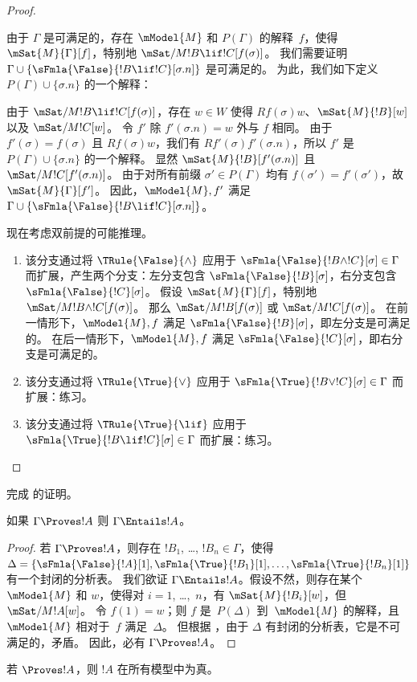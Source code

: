 \documentclass[../../../include/open-logic-section]{subfiles}
\begin{document}
\begin{proof}
\begin{enumerate}
  由于 $\Gamma$ 是可满足的，存在 $\mModel{M}$ 和 $P(\Gamma)$ 的解释~$f$，使得 $\mSat{M}{\Gamma}[f]$，特别地 $\mSat/{M}{!B \lif !C}[f(\sigma)]$。
  我们需要证明 $\Gamma \cup \{\sFmla{\False}{!B \lif !C}[\sigma.n]\}$ 是可满足的。
  为此，我们如下定义 $P(\Gamma)
  \cup \{\sigma.n\}$ 的一个解释：

  由于 $\mSat/{M}{!B \lif !C}[f(\sigma)]$，存在 $w \in W$ 使得 $Rf(\sigma)w$、$\mSat{M}{!B}[w]$ 以及 $\mSat/{M}{!C}[w]$。
  令 $f'$ 除 $f'(\sigma.n) = w$ 外与 $f$ 相同。
  由于 $f'(\sigma) = f(\sigma)$ 且 $Rf(\sigma)w$，我们有 $Rf'(\sigma)f'(\sigma.n)$，所以 $f'$ 是 $P(\Gamma) \cup \{\sigma.n\}$ 的一个解释。
  显然 $\mSat{M}{!B}[f'(\sigma.n)]$ 且 $\mSat/{M}{!C}[f'(\sigma.n)]$。
  由于对所有前缀 $\sigma' \in P(\Gamma)$ 均有 $f(\sigma') = f'(\sigma')$，故 $\mSat{M}{\Gamma}[f']$。
  因此，$\mModel{M}, f'$ 满足 $\Gamma \cup \{\sFmla{\False}{!B \lif !C}[\sigma.n]\}$。
\end{enumerate}
现在考虑双前提的可能推理。
\begin{enumerate}
\item 该分支通过将 $\TRule{\False}{\land}$ 应用于 $\sFmla{\False}{!B \land !C}[\sigma] \in \Gamma$ 而扩展，产生两个分支：左分支包含 $\sFmla{\False}{!B}[\sigma]$，右分支包含 $\sFmla{\False}{!C}[\sigma]$。
  假设 $\mSat{M}{\Gamma}[f]$，特别地 $\mSat/{M}{!B \land !C}[f(\sigma)]$。
  那么 $\mSat/{M}{!B}[f(\sigma)]$ 或 $\mSat/{M}{!C}[f(\sigma)]$。
  在前一情形下，$\mModel{M}, f$ 满足 $\sFmla{\False}{!B}[\sigma]$，即左分支是可满足的。
  在后一情形下，$\mModel{M}, f$ 满足 $\sFmla{\False}{!C}[\sigma]$，即右分支是可满足的。
\item 该分支通过将 $\TRule{\True}{\lor}$ 应用于 $\sFmla{\True}{!B \lor !C}[\sigma] \in \Gamma$ 而扩展：练习。
\item 该分支通过将 $\TRule{\True}{\lif}$ 应用于 $\sFmla{\True}{!B \lif !C}[\sigma] \in \Gamma$ 而扩展：练习。
\end{enumerate}
\end{proof}

\begin{prob}
完成  的证明。
\end{prob}

\begin{cor}
如果 $\Gamma \Proves !A$ 则 $\Gamma \Entails !A$。
\end{cor}

\begin{proof}
  若 $\Gamma \Proves !A$，则存在 $!B_1$, \dots, $!B_n \in \Gamma$，使得 $\Delta = \{\sFmla{\False}{!A}[1], \sFmla{\True}{!B_1}[1],
  \dots, \sFmla{\True}{!B_n}[1]\}$ 有一个封闭的分析表。
  我们欲证 $\Gamma \Entails !A$。假设不然，则存在某个 $\mModel{M}$ 和 $w$，使得对 $i=1$, \dots,~$n$，有 $\mSat{M}{!B_i}[w]$，但 $\mSat/{M}{!A}[w]$。
  令 $f(1) = w$；则 $f$ 是~$P(\Delta)$ 到~$\mModel{M}$ 的解释，且 $\mModel{M}$ 相对于~$f$ 满足~$\Delta$。
  但根据 ，由于 $\Delta$ 有封闭的分析表，它是不可满足的，矛盾。
  因此，必有 $\Gamma \Proves !A$。
\end{proof}

\begin{cor}
若 $\Proves !A$，则 $!A$ 在所有模型中为真。
\end{cor}
\end{document}
